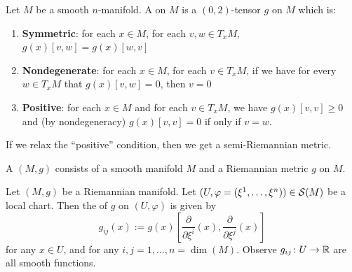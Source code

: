 

\begin{definition}
Let $M$ be a smooth $n$-manifold. A  on $M$
is a $(0,2)$-tensor $g$ on $M$ which is:
\begin{enumerate}
\item \textbf{Symmetric}: for each $x\in M$, for each $v,w\in T_{x}M$, $g(x)[v,w]=g(x)[w,v]$
\item \textbf{Nondegenerate}: for each $x\in M$, for each $v\in T_{x}M$,
  if we have for every $w\in T_{x}M$ that $g(x)[v,w]=0$, then $v=0$
\item \textbf{Positive}: for each $x\in M$ and for each $v\in T_{x}M$,
  we have $g(x)[v,v]\geq0$ and (by nondegeneracy) $g(x)[v,v]=0$ if only
  if $v=w$.
\end{enumerate}
If we relax the ``positive'' condition, then we get a semi-Riemannian
metric.
\end{definition}

\begin{definition}
A  $(M,g)$ consists of a smooth manifold
$M$ and a Riemannian metric $g$ on $M$.
\end{definition}

\begin{definition}
Let $(M,g)$ be a Riemannian manifold. Let
$(U,\varphi=(\xi^{1},\dots,\xi^{n}))\in\mathcal{S}(M)$ be a local
chart. Then the  of $g$ on $(U,\varphi)$ is
given by
\begin{equation}
g_{ij}(x):=g(x)\left[\frac{\partial}{\partial\xi^{i}}(x),\frac{\partial}{\partial\xi^{j}}(x)\right]
\end{equation}
for any $x\in U$, and for any $i,j=1,\dots,n=\dim(M)$. Observe
$g_{ij}\colon U\to\mathbb{R}$ are all smooth functions.
\end{definition}

